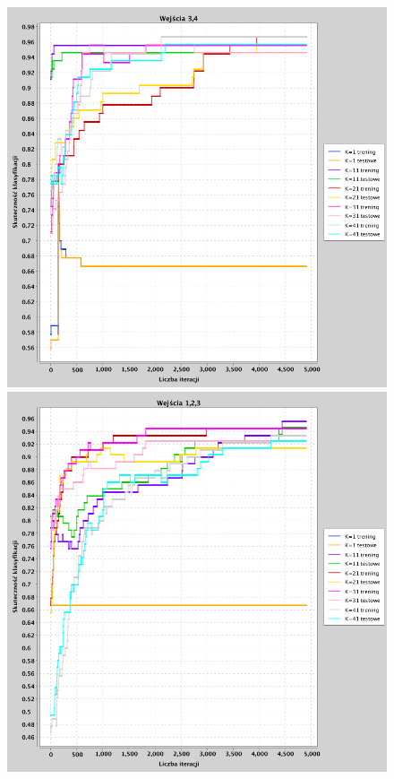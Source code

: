 \documentclass[a4paper, portrait,11pt]{article}
\begin{document}
\begin{figure}[!htb]
  \begin{minipage}{0.33\textwidth}
    \centering
    \includegraphics[width=1\linewidth]{../data/classification4/1/2_3,4.png}
    \caption{\label{fig:41_2_3,4}}
  \end{minipage}
  \begin{minipage}{0.33\textwidth}
    \centering
    \includegraphics[width=1\linewidth]{../data/classification4/1/3_1,2,3.png}

\end{minipage}
\end{figure}
\end{document}
